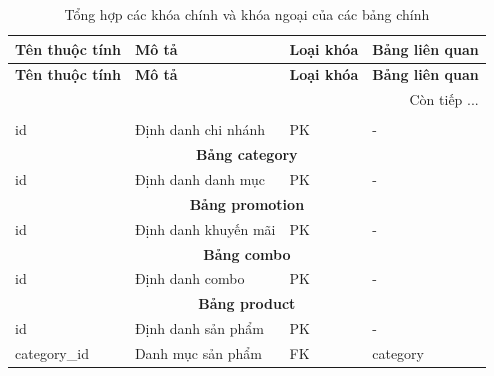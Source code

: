\begin{longtable}{|l|p{6cm}|l|l|}
	\caption{Tổng hợp các khóa chính và khóa ngoại của các bảng chính}
	\hline
	\textbf{Tên thuộc tính} & \textbf{Mô tả}                                 & \textbf{Loại khóa} & \textbf{Bảng liên quan} \\
	\hline
	\endfirsthead

	\hline
	\textbf{Tên thuộc tính} & \textbf{Mô tả}                                 & \textbf{Loại khóa} & \textbf{Bảng liên quan} \\
	\hline
	\endhead

	\hline \multicolumn{4}{|r|}{{Còn tiếp ...}}                                                                             \\
	\hline
	\endfoot

	\hline
	\endlastfoot

	\multicolumn{4}{|c|}{\textbf{Bảng branch}}                                                                              \\
	\hline
	id                      & Định danh chi nhánh                            & PK                 & -                       \\
	\hline

	\multicolumn{4}{|c|}{\textbf{Bảng category}}                                                                            \\
	\hline
	id                      & Định danh danh mục                             & PK                 & -                       \\
	\hline

	\multicolumn{4}{|c|}{\textbf{Bảng promotion}}                                                                           \\
	\hline
	id                      & Định danh khuyến mãi                           & PK                 & -                       \\
	\hline

	\multicolumn{4}{|c|}{\textbf{Bảng combo}}                                                                               \\
	\hline
	id                      & Định danh combo                                & PK                 & -                       \\
	\hline

	\multicolumn{4}{|c|}{\textbf{Bảng product}}                                                                             \\
	\hline
	id                      & Định danh sản phẩm                             & PK                 & -                       \\
	category\_id            & Danh mục sản phẩm                              & FK                 & category                \\
	\hline


\end{longtable}
